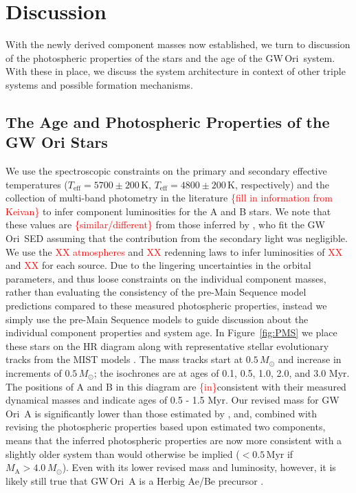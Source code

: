 \documentclass[twocolumn]{aastex61}
\newcommand{\todo}[1]{ \textcolor{red}{#1}}
\newcommand{\obj}{GW\,Ori}
\begin{document}
\section{Discussion} \label{sec:discussion}
With the newly derived component masses now established, we turn to discussion of the photospheric properties of the stars and the age of the \obj\ system. With these in place, we discuss the system architecture in context of other triple systems and possible formation mechanisms.

\subsection{The Age and Photospheric Properties of the GW Ori Stars}
We use the spectroscopic constraints on the primary and secondary effective temperatures ($T_\mathrm{eff} = 5700 \pm 200\,\mathrm{K}$, $T_\mathrm{eff} = 4800 \pm 200\,\mathrm{K}$, respectively) and the collection of multi-band photometry in the literature \todo{\{fill in information from Keivan\}} to infer component luminosities for the A and B stars. We note that these values are \todo{\{similar/different\}} from those inferred by \citet{fang14}, who fit the \obj\ SED assuming that the contribution from the secondary light was negligible. We use the \todo{XX atmospheres} and \todo{XX} redenning laws to infer luminosities of \todo{XX} and \todo{XX} for each source.
Due to the lingering uncertainties in the orbital parameters, and thus loose constraints on the individual component masses, rather than evaluating the consistency of the pre-Main Sequence model predictions compared to these measured photospheric properties, instead we simply use the pre-Main Sequence models to guide discussion about the individual component properties and system age. In Figure~\ref{fig:PMS} we place these stars on the HR diagram along with representative stellar evolutionary tracks from the MIST models \citep{choi16}. The mass tracks start at $0.5\,M_\odot$ and increase in increments of $0.5\,M_\odot$; the isochrones are at ages of 0.1, 0.5, 1.0, 2.0, and 3.0 Myr. The positions of A and B in this diagram are \todo{\{in\}}consistent with their measured dynamical masses and indicate ages of 0.5 - 1.5 Myr. Our revised mass for \obj~A is significantly lower than those estimated by \citet{berger11,fang14}, and, combined with revising the photospheric properties based upon estimated two components, means that the inferred photospheric properties are now more consistent with a slightly older system than would otherwise be implied ($< 0.5$\,Myr if $M_\mathrm{A} > 4.0 \,M_\odot$). Even with its lower revised mass and luminosity, however, it is likely still true that \obj~A is a Herbig Ae/Be precursor \citep[as noted by][]{fang14}.
\end{document}
